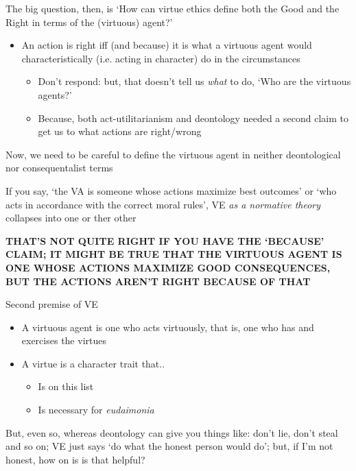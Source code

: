 \documentclass[11pt]{article}
\begin{document}
\noindent The big question, then, is `How can virtue ethics define both the Good and the Right in terms of the (virtuous) agent?'

\begin{itemize}\item{An action is right iff (and because) it is what a virtuous agent would characteristically (i.e. acting in character) do in the circumstances}\begin{itemize}\item{Don't respond: but, that doesn't tell us \emph{what} to do, `Who are the virtuous agents?'}\item{Because, both act-utilitarianism and deontology needed a second claim to get us to what actions are right/wrong}\end{itemize}\end{itemize}

\noindent Now, we need to be careful to define the virtuous agent in neither deontological nor consequentalist terms
\vspace*{2mm}

\noindent If you say, `the VA is someone whose actions maximize best outcomes' or `who acts in accordance with the correct moral rules', VE \emph{as a normative theory} collapses into one or ther other
\vspace*{2mm}

\noindent\textbf{THAT'S NOT QUITE RIGHT IF YOU HAVE THE `BECAUSE' CLAIM; IT MIGHT BE TRUE THAT THE VIRTUOUS AGENT IS ONE WHOSE ACTIONS MAXIMIZE GOOD CONSEQUENCES, BUT THE ACTIONS AREN'T RIGHT BECAUSE OF THAT}
\vspace*{2mm}

\noindent Second premise of VE

\begin{itemize}\item{A virtuous agent is one who acts virtuously, that is, one who has and exercises the virtues}\item{A virtue is a character trait that..}\begin{itemize}\item{Is on this list}\item{Is necessary for \emph{eudaimonia}}\end{itemize}\end{itemize}

\noindent But, even so, whereas deontology can give you things like: don't lie, don't steal and so on; VE just says `do what the honest person would do'; but, if I'm not honest, how on is is that helpful?
\vspace*{2mm}
\end{document}
